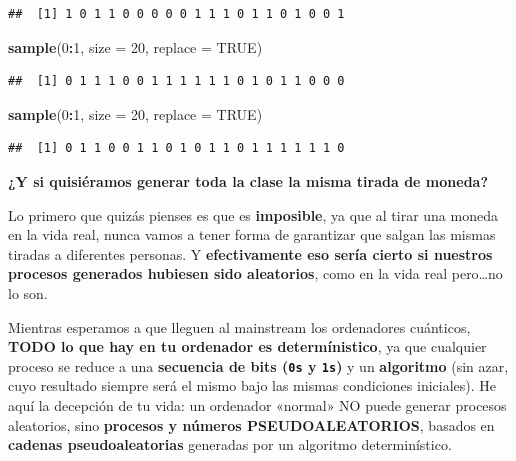 \documentclass[11pt,]{book}
\newenvironment{Shaded}{\begin{snugshade}}{\end{snugshade}}
\newcommand{\DataTypeTok}[1]{\textcolor[rgb]{0.27,0.27,0.27}{#1}}
\newcommand{\DecValTok}[1]{\textcolor[rgb]{0.06,0.06,0.06}{#1}}
\newcommand{\KeywordTok}[1]{\textcolor[rgb]{0.27,0.27,0.27}{\textbf{#1}}}
\newcommand{\NormalTok}[1]{#1}
\newcommand{\OperatorTok}[1]{\textcolor[rgb]{0.43,0.43,0.43}{\textbf{#1}}}
\newcommand{\OtherTok}[1]{\textcolor[rgb]{0.37,0.37,0.37}{#1}}
\begin{document}
\begin{verbatim}
##  [1] 1 0 1 1 0 0 0 0 0 1 1 1 0 1 1 0 1 0 0 1
\end{verbatim}

\begin{Shaded}
\begin{Highlighting}[]
\KeywordTok{sample}\NormalTok{(}\DecValTok{0}\OperatorTok{:}\DecValTok{1}\NormalTok{, }\DataTypeTok{size =} \DecValTok{20}\NormalTok{, }\DataTypeTok{replace =} \OtherTok{TRUE}\NormalTok{)}
\end{Highlighting}
\end{Shaded}

\begin{verbatim}
##  [1] 0 1 1 1 0 0 1 1 1 1 1 1 0 1 0 1 1 0 0 0
\end{verbatim}

\begin{Shaded}
\begin{Highlighting}[]
\KeywordTok{sample}\NormalTok{(}\DecValTok{0}\OperatorTok{:}\DecValTok{1}\NormalTok{, }\DataTypeTok{size =} \DecValTok{20}\NormalTok{, }\DataTypeTok{replace =} \OtherTok{TRUE}\NormalTok{)}
\end{Highlighting}
\end{Shaded}

\begin{verbatim}
##  [1] 0 1 1 0 0 1 1 0 1 0 1 1 0 1 1 1 1 1 1 0
\end{verbatim}

\textbf{¿Y si quisiéramos generar toda la clase la misma tirada de moneda?}

Lo primero que quizás pienses es que es \textbf{imposible}, ya que al tirar una moneda en la vida real, nunca vamos a tener forma de garantizar que salgan las mismas tiradas a diferentes personas. Y \textbf{efectivamente eso sería cierto si nuestros procesos generados hubiesen sido aleatorios}, como en la vida real pero\ldots{}no lo son.

Mientras esperamos a que lleguen al mainstream los ordenadores cuánticos, \textbf{TODO lo que hay en tu ordenador es determínistico}, ya que cualquier proceso se reduce a una \textbf{secuencia de bits (\texttt{0\textquotesingle{}s} y \texttt{1\textquotesingle{}s})} y un \textbf{algoritmo} (sin azar, cuyo resultado siempre será el mismo bajo las mismas condiciones iniciales). He aquí la decepción de tu vida: un ordenador «normal» NO puede generar procesos aleatorios, sino \textbf{procesos y números PSEUDOALEATORIOS}, basados en \textbf{cadenas pseudoaleatorias} generadas por un algoritmo determinístico.
\end{document}
